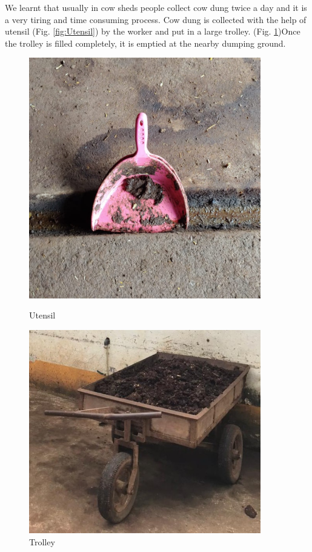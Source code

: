 \noindent We learnt that usually in cow sheds people collect cow dung twice a day and it is a very tiring and time consuming process. Cow dung is collected with the help of utensil (Fig. \ref{fig:Utensil}) by the worker and put in a large trolley. (Fig. \ref{fig:Trolley})Once the trolley is filled completely, it is emptied at the nearby dumping ground. 

\begin{figure}[H]
  \centering
    \begin{minipage}{0.35\textwidth}
    \centering
      \includegraphics[width=0.9\textwidth]{Utensil.jpg}
      \caption{Utensil}
      \label{fig:Utensil}
    \end{minipage}
    \begin{minipage}{0.40\textwidth}
    \centering
      \includegraphics[width=0.9\textwidth]{Trolley.jpg}
      \caption{Trolley}
      \label{fig:Trolley}
    \end{minipage}
\end{figure}

